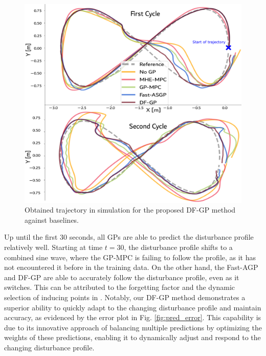  \begin{figure}[t]
	\centering
	\includegraphics[width=1\linewidth]{figures/Simulations/lem_mhe.pdf}
	\caption{Obtained trajectory in simulation for the proposed \ac{DF-GP} method against baselines. }%
	\label{fig:traj}
\end{figure}
 Up until the first 30 seconds, all  \ac{GP}s are able to predict the disturbance profile relatively well. Starting at time $t=30$, the disturbance profile shifts to a combined sine wave, where the GP-MPC \cite{mohit_gp} is failing to follow the profile, as it has not encountered it before in the training data. On the other hand, the Fast-AGP and \ac{DF-GP} are able to accurately follow the disturbance profile, even as it switches. This can be attributed to the forgetting factor and the dynamic selection of inducing points in \cite{asgp}. Notably, our \ac{DF-GP} method demonstrates a superior ability to quickly adapt to the changing disturbance profile and maintain accuracy, as evidenced by the error plot in Fig. \ref{fig:pred_error}. This capability is due to its innovative approach of balancing multiple predictions by optimizing the weights of these predictions, enabling it to dynamically adjust and respond to the changing disturbance profile.

